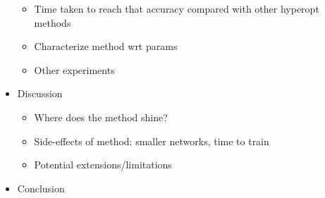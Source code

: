 \documentclass{article}
\begin{document}
\begin{itemize}
\begin{itemize}
    \item Time taken to reach that accuracy compared with other hyperopt methods
    \item Characterize method wrt params
    \item Other experiments  
  \end{itemize}
  \item Discussion
  \begin{itemize}
    \item Where does the method shine?
    \item Side-effects of method: smaller networks, time to train
    \item Potential extensions/limitations
  \end{itemize}
  \item Conclusion
\end{itemize}









\appendix



\nocite{OpenML2013}



\end{document}
